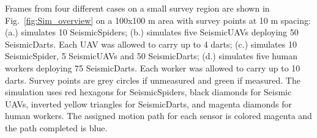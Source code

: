    Frames from four different cases on a small survey region are shown in Fig.~\ref{fig:Sim_overview} on a 100x100 m area with survey points at 10 m spacing: (a.) simulates 10 SeismicSpiders;  
(b.) simulates five SeismicUAVs deploying 50 SeismicDarts. Each UAV was allowed to carry up to 4 darts;
(c.) simulates 10 SeismicSpider, 5 SeismicUAVs and 50 SeismicDarts;
(d.) simulates five human workers deploying 75 SeismicDarts. Each worker was allowed to carry up to 10 darts. 
 Survey points are grey circles if unmeasured and green if measured.   The simulation uses red hexagons for SeismicSpiders,  black diamonds for Seismic UAVs,  inverted yellow triangles for SeismicDarts, and magenta diamonds for human workers. The assigned motion path for each sensor is colored magenta and the path completed is blue. 

